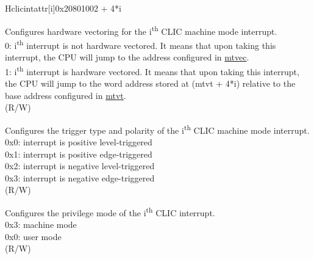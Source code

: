 \begin{register}{H}{{clicintattr[i]}}{0x20801002 + 4*i}\label{regdesc:MCLICINTATTR_REG_i}
%
%
%
%
\regnewline%
\begin{regdesc}
\begin{reglist}
\label{fielddesc:MCLICINTATTR_i_SHV}\item [{SHV}] Configures hardware vectoring for the i\textsuperscript{th} CLIC machine mode interrupt. \\
0: i\textsuperscript{th} interrupt is not hardware vectored. It means that upon taking this interrupt, the CPU will jump to the address configured in \hyperref[fielddesc:MTVECBASE]{mtvec}. \\
1: i\textsuperscript{th} interrupt is hardware vectored. It means that upon taking this interrupt, the CPU will jump to the word address stored at (mtvt + 4*i) relative to the base address configured in \hyperref[fielddesc:MTVTBASE]{mtvt}. \\
(R/W)
\label{fielddesc:MCLICINTATTR_i_TRIG}\item [{TRIG}] Configures the trigger type and polarity of the i\textsuperscript{th} CLIC machine mode interrupt. \\
0x0: interrupt is positive level-triggered \\
0x1: interrupt is positive edge-triggered \\
0x2: interrupt is negative level-triggered \\
0x3: interrupt is negative edge-triggered \\
(R/W)
\label{fielddesc:MCLICINTATTR_i_MODE}\item [{MODE}] Configures the privilege mode of the i\textsuperscript{th} CLIC interrupt. \\
0x3: machine mode \\
0x0: user mode \\
(R/W)
\end{reglist}
\end{regdesc}
\end{register}

